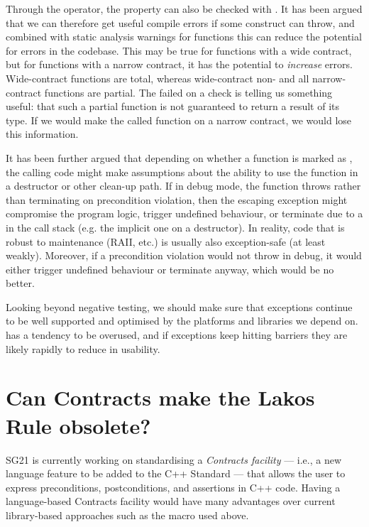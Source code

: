 Through the  operator, the  property can also be checked with . It has been argued that we can therefore get useful compile errors if some construct can throw, and combined with static analysis warnings for  functions this can reduce the potential for errors in the codebase. This may be true for functions with a wide contract, but for functions with a narrow contract, it has the potential to \emph{increase} errors. Wide-contract  functions are total, whereas wide-contract non- and all narrow-contract functions are partial. The failed  on a  check is telling us something useful: that such a partial function is not guaranteed to return a result of its type. If we would make the called function  on a narrow contract, we would lose this information.

It has been further argued that depending on whether a function is marked as , the calling code might make assumptions about the ability to use the function in a destructor or other clean-up path. If in debug mode, the function throws rather than terminating on precondition violation, then the escaping exception might compromise the program logic, trigger undefined behaviour, or terminate due to a  in the call 
stack (e.g. the implicit one on a destructor). In reality, code that is robust to maintenance (RAII, etc.) is usually also exception-safe (at least weakly). Moreover, if a precondition violation would not throw in debug, it would either trigger undefined behaviour or terminate anyway, which would be no better.

Looking beyond negative testing, we should make sure that exceptions continue to be well supported and optimised by the platforms and libraries we depend on.   has a tendency to be overused, and if exceptions keep hitting  barriers they are likely rapidly to reduce in usability.

\section{Can Contracts make the Lakos Rule obsolete?}
\label{sec:contracts}

SG21 is currently working on standardising a \emph{Contracts facility} --- i.e., a new language feature to be added to the C++ Standard --- that allows the user to express preconditions, postconditions, and assertions in C++ code. Having a language-based Contracts facility would have many advantages over current library-based approaches such as the  macro used above.

